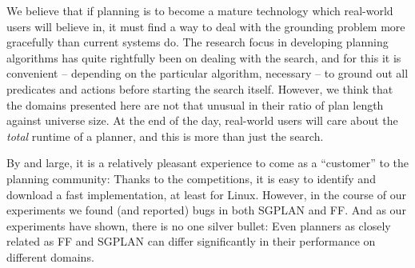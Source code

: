
We believe that if planning is to become a mature technology which
real-world users will believe in, it must find a way to deal with the
grounding problem more gracefully than current systems do.  The
research focus in developing planning algorithms has quite rightfully
been on dealing with the search, and for this it is convenient --
depending on the particular algorithm, necessary -- to ground out all
predicates and actions before starting the search itself.  However, we
think that the domains presented here are not that unusual in their
ratio of plan length against universe size.  At the end of the day,
real-world users will care about the \emph{total} runtime of a
planner, and this is more than just the search.

By and large, it is a relatively pleasant experience to come as a
``customer'' to the planning community: Thanks to the competitions, it
is easy to identify and download a fast implementation, at least for
Linux.  However, in the course of our experiments we found (and
reported) bugs in both SGPLAN and FF.  And as our experiments have
shown, there is no one silver bullet: Even planners as closely related
as FF and SGPLAN can differ significantly in their performance on
different domains.

